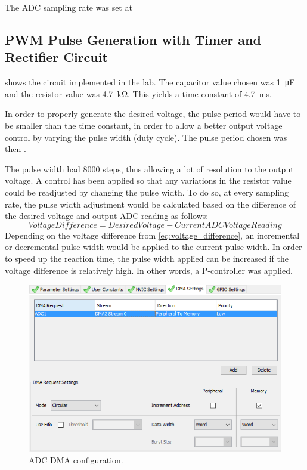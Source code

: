 \documentclass[a4paper,titlepage]{article}
\begin{document}
The ADC sampling rate was set at 

\subsection{PWM Pulse Generation with Timer and Rectifier Circuit}
 shows the circuit implemented in the lab. The capacitor value chosen was \SI{1}{\micro\farad} and the resistor value was \SI{4.7}{\kilo\ohm}. This yields a time constant of \SI{4.7}{\milli \second}.

In order to properly generate the desired voltage, the pulse period would have to be smaller than the time constant, in order to allow a better output voltage control by varying the pulse width (duty cycle). The pulse period chosen was then .

The pulse width had 8000 steps, thus allowing a lot of resolution to the output voltage. A control has been applied so that any variations in the resistor value could be readjusted by changing the pulse width. To do so, at every sampling rate, the pulse width adjustment would be calculated based on the difference of the desired voltage and output ADC reading as follows:
\begin{equation}
Voltage Difference = Desired Voltage - Current ADC Voltage Reading
\label{eq:voltage_difference}
\end{equation}
Depending on the voltage difference from \eqref{eq:voltage_difference}, an incremental or decremental pulse width would be applied to the current pulse width. In order to speed up the reaction time, the pulse width applied can be increased if the voltage difference is relatively high. In other words, a P-controller was applied.

\begin{figure}[!htb]
  \centering
  \includegraphics[width=\columnwidth]{figures/adc_config_dma.png}
  \caption{ADC DMA configuration.}
  \label{fig:adc_config_dma}
\end{figure}
\end{document}
